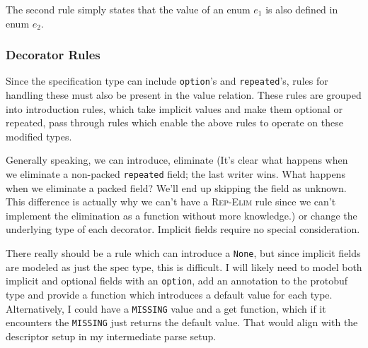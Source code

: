The second rule simply states that the value of an enum $e_1$ is also defined in
enum $e_2$.

\subsubsection{Decorator Rules}

Since the specification type can include \texttt{option}'s and
\texttt{repeated}'s, rules for handling these must also be present in the value
relation. These rules are grouped into introduction rules, which take implicit
values and make them optional or repeated, pass through rules which enable the
above rules to operate on these modified types.

Generally speaking, we can introduce, eliminate {\color{red} (It's clear what
  happens when we eliminate a non-packed \texttt{repeated} field; the last
  writer wins. What happens when we eliminate a packed field? We'll end up
  skipping the field as unknown. This difference is actually why we can't have a
  \textsc{Rep-Elim} rule since we can't implement the elimination as a function
  without more knowledge.)} or change the
underlying type of each decorator. Implicit fields require no special
consideration.

{\color{red} There really should be a rule which can introduce a \texttt{None},
  but since implicit fields are modeled as just the spec type, this is
  difficult. I will likely need to model both implicit and optional fields with
  an \texttt{option}, add an annotation to the protobuf type and provide a
  function which introduces a default value for each type. Alternatively, I
  could have a \texttt{MISSING} value and a get function, which if it encounters
  the \texttt{MISSING} just returns the default value. That would align with the
  descriptor setup in my intermediate parse setup.}

\begin{mathpar}


  


\end{mathpar}

